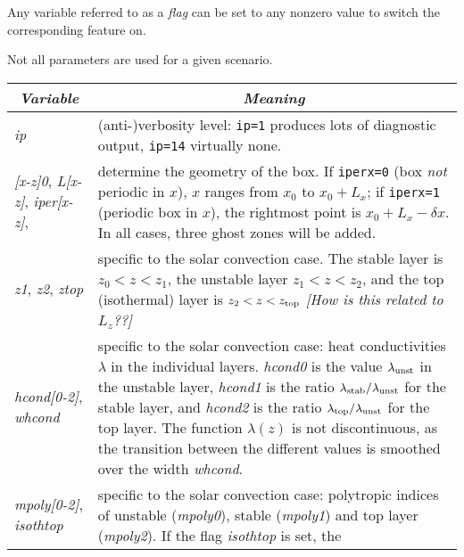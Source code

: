 \documentclass[12pt,twoside,notitlepage,a4paper]{article}
\newcommand{\Note}[1]{\emph{[#1]}}
\newcommand{\code}[1]{\texttt{#1}}
\newcommand{\var}[1]{\textsl{#1}\index{#1}\/}
\newcommand{\dfn}[1]{\textsl{#1}\index{#1}\/}
\begin{document}
Any variable referred to as a \dfn{flag} can be set to any nonzero value
to switch the corresponding feature on.

Not all parameters are used for a given scenario.

\begin{longtable}{lp{}}
\toprule
  \multicolumn{1}{c}{\emph{Variable}}
               & \multicolumn{1}{c}{\emph{Meaning}} \\
\midrule
  \var{ip}     & (anti-)verbosity level: \code{ip=1} produces lots of
                 diagnostic output, \code{ip=14} virtually none. \\
  \var{[x-z]0},
  \var{L[x-z]},
  \var{iper[x-z]},
               & determine the geometry of the box.
                 If \code{iperx=0} (box \emph{not\/} periodic in $x$), $x$
                 ranges from $x_0$ to $x_0+L_x$; if \code{iperx=1}
                 (periodic box in $x$), the rightmost point is
                 $x_0+L_x-\delta x$. In all cases, three ghost zones will
                 be added. \\
  \var{z1}, \var{z2}, \var{ztop}
               & specific to the solar convection case.
                 The stable layer is $z_0 < z < z_1$, the unstable layer
                 $z_1 < z < z_2$, and the top (isothermal) layer is
                 $z_2 < z < z_{\rm top}$
                 \Note{How is this related to $L_z$??} \\
  \var{hcond[0-2]}, \var{whcond}
               & specific to the solar convection case: heat conductivities
                 $\lambda$ in the individual layers. \var{hcond0} is the
                 value $\lambda_{\rm unst}$ in the unstable layer,
                 \var{hcond1} is the ratio
                 $\lambda_{\rm stab}/\lambda_{\rm unst}$ for the stable
                 layer, and \var{hcond2} is the ratio 
                 $\lambda_{\rm top}/\lambda_{\rm unst}$ for the top layer.
                 The function $\lambda(z)$ is not discontinuous, as the
                 transition between the different values is smoothed over
                 the width \var{whcond}. \\
  \var{mpoly[0-2]}, \var{isothtop}
               & specific to the solar convection case: polytropic indices
                 of unstable (\var{mpoly0}), stable (\var{mpoly1}) and top
                 layer (\var{mpoly2}).
                 If the flag \var{isothtop} is set, the

\end{longtable}
\end{document}
